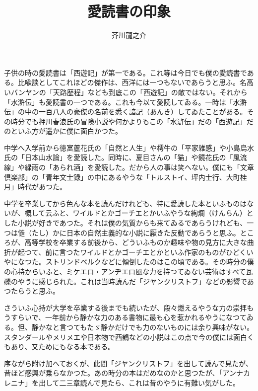 \documentclass{ujarticle}
\begin{document}
\title{愛読書の印象}
\author{芥川龍之介}
\date{}
\maketitle

子供の時の愛読書は「西遊記」が第一である。これ等は今日でも僕の愛読書である。比喩談としてこれほどの傑作は、西洋には一つもないであらうと思ふ。名高いバンヤンの「天路歴程」なども到底この「西遊記」の敵ではない。それから「水滸伝」も愛読書の一つである。これも今以て愛読してゐる。一時は「水滸伝」の中の一百八人の豪傑の名前を悉く諳記（あんき）してゐたことがある。その時分でも押川春浪氏の冒険小説や何かよりもこの「水滸伝」だの「西遊記」だのといふ方が遥かに僕に面白かつた。

中学へ入学前から徳富蘆花氏の「自然と人生」や樗牛の「平家雑感」や小島烏水氏の「日本山水論」を愛読した。同時に、夏目さんの「猫」や鏡花氏の「風流線」や緑雨の「あられ酒」を愛読した。だから人の事は笑へない。僕にも「文章倶楽部」の「青年文士録」の中にあるやうな「トルストイ、坪内士行、大町桂月」時代があつた。

中学を卒業してから色んな本を読んだけれども、特に愛読した本といふものはないが、概して云ふと、ワイルドとかゴーチエとかいふやうな絢爛（けんらん）とした小説が好きであつた。それは僕の気質からも来てゐるであらうけれども、一つは慥（たし）かに日本の自然主義的な小説に厭きた反動であらうと思ふ。ところが、高等学校を卒業する前後から、どういふものか趣味や物の見方に大きな曲折が起つて、前に言つたワイルドとかゴーチエとかといふ作家のものがひどくいやになつた。ストリンドベルクなどに傾倒したのはこの頃である。その時分の僕の心持からいふと、ミケエロ・アンヂエロ風な力を持つてゐない芸術はすべて瓦礫のやうに感じられた。これは当時読んだ「ジヤンクリストフ」などの影響であつたらうと思ふ。

さういふ心持が大学を卒業する後までも続いたが、段々燃えるやうな力の崇拝もうすらいで、一年前から静かな力のある書物に最も心を惹かれるやうになつてゐる。但、静かなと言つてもたゞ静かだけでも力のないものには余り興味がない。スタンダールやメリメエや日本物で西鶴などの小説はこの点で今の僕には面白くもあり、又ためにもなる本である。

序ながら附け加へておくが、此間「ジヤンクリストフ」を出して読んで見たが、昔ほど感興が乗らなかつた。あの時分の本はだめなのかと思つたが、「アンナカレニナ」を出して二三章読んで見たら、これは昔のやうに有難い気がした。
\end{document}
